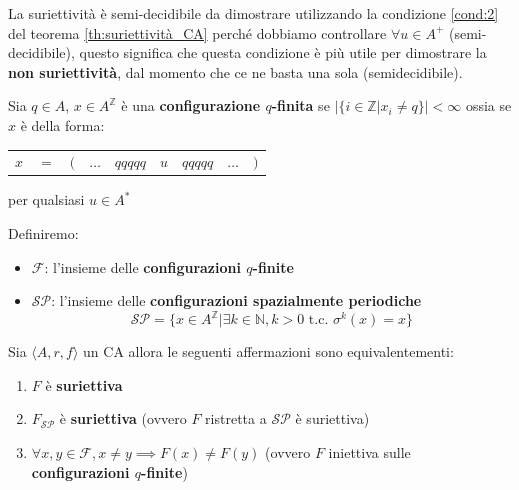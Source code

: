 \begin{nota}
    La suriettività è semi-decidibile da dimostrare utilizzando la condizione \ref{cond:2}
    del teorema \ref{th:suriettività_CA} perché dobbiamo controllare $\forall u \in A^+$ (semi-decidibile),
    questo significa che questa condizione è più utile per dimostrare la \textbf{non
        suriettività}, dal momento che ce ne basta una sola (semidecidibile).
\end{nota}

\begin{definizione}
    Sia $q\in A$, $x\in A^\mathbb{Z}$ è una \textbf{configurazione $q$-finita}
    se $|\{i\in \mathbb{Z}| x_i\ne q\}|< \infty$ ossia se $x$ è della forma:
    \begin{table}[!h]
        \centering
        \begin{tabular}{ccccccccc}
            $x$ & $=$ & $($ & $\dots$ & $qqqqq$ & $u$ & $qqqqq$ & $\dots$ & $)$ \\
        \end{tabular}
    \end{table}
    per qualsiasi $u\in A^\ast$
\end{definizione}

\begin{definizione}
    Definiremo:
    \begin{itemize}
        \item $\mathcal{F}$: l'insieme delle \textbf{configurazioni $q$-finite}
        \item $\mathcal{SP}$: l'insieme delle \textbf{configurazioni spazialmente periodiche}
              \begin{equation*}
                  \mathcal{SP}= \{x\in A^\mathbb{Z} | \exists k \in \mathbb{N}, k>0 \text{ t.c. }\sigma^k(x)=x\}
              \end{equation*}
    \end{itemize}
\end{definizione}

\begin{teorema}
    Sia $\langle A,r,f\rangle$ un CA allora le seguenti affermazioni sono equivalentementi:
    \begin{enumerate}
        \item $F$ è \textbf{suriettiva}
        \item $F_{\mathcal{SP}}$ è \textbf{suriettiva} (ovvero $F$ ristretta a $\mathcal{SP}$ è suriettiva)
        \item $\forall x,y \in \mathcal{F}, x\ne y \implies F(x)\ne F(y)$ (ovvero $F$ iniettiva sulle \textbf{configurazioni $q$-finite})
    \end{enumerate}
\end{teorema}

